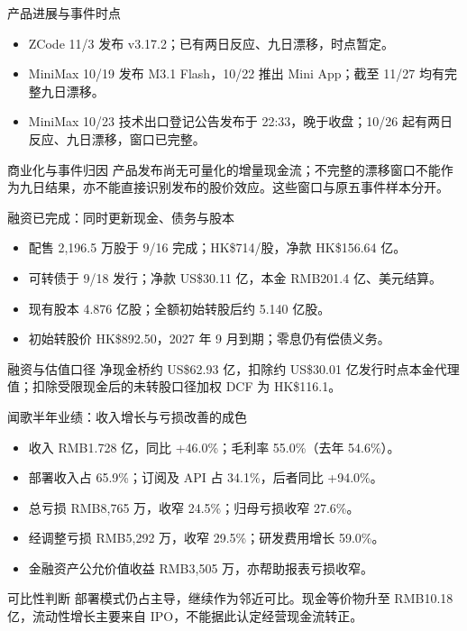 \documentclass[aspectratio=169,11pt]{beamer}
\newcommand{\smallnote}[1]{\vspace{0.2em}{\footnotesize #1}}
\begin{document}
\begin{frame}{产品进展与事件时点}
  \begin{itemize}
    \item ZCode 11/3 发布 v3.17.2；已有两日反应、九日漂移，时点暂定。
    \item MiniMax 10/19 发布 M3.1 Flash，10/22 推出 Mini App；截至 11/27 均有完整九日漂移。
    \item MiniMax 10/23 技术出口登记公告发布于 22:33，晚于收盘；10/26 起有两日反应、九日漂移，窗口已完整。
  \end{itemize}
  \begin{block}{商业化与事件归因}
    产品发布尚无可量化的增量现金流；不完整的漂移窗口不能作为九日结果，亦不能直接识别发布的股价效应。这些窗口与原五事件样本分开。
  \end{block}
  \smallnote{来源：ZCode 官方 changelog、MiniMax 产品公告及 10/23 港交所技术出口登记公告。}
\end{frame}

\begin{frame}{融资已完成：同时更新现金、债务与股本}
  \begin{itemize}
    \item 配售 2,196.5 万股于 9/16 完成；HK\$714/股，净款 HK\$156.64 亿。
    \item 可转债于 9/18 发行；净款 US\$30.11 亿，本金 RMB201.4 亿、美元结算。
    \item 现有股本 4.876 亿股；全额初始转股后约 5.140 亿股。
    \item 初始转股价 HK\$892.50，2027 年 9 月到期；零息仍有偿债义务。
  \end{itemize}
  \begin{block}{融资与估值口径}
    净现金桥约 US\$62.93 亿，扣除约 US\$30.01 亿发行时点本金代理值；扣除受限现金后的未转股口径加权 DCF 为 HK\$116.1。
  \end{block}
  \smallnote{来源：9/18 港交所完成公告。本金代理值 = 美元总款 / 100.5\%，非公允价值；不含未知现金消耗。}
\end{frame}

\begin{frame}{闻歌半年业绩：收入增长与亏损改善的成色}
  \begin{itemize}
    \item 收入 RMB1.728 亿，同比 +46.0\%；毛利率 55.0\%（去年 54.6\%）。
    \item 部署收入占 65.9\%；订阅及 API 占 34.1\%，后者同比 +94.0\%。
    \item 总亏损 RMB8,765 万，收窄 24.5\%；归母亏损收窄 27.6\%。
    \item 经调整亏损 RMB5,292 万，收窄 29.5\%；研发费用增长 59.0\%。
    \item 金融资产公允价值收益 RMB3,505 万，亦帮助报表亏损收窄。
  \end{itemize}
  \begin{block}{可比性判断}
    部署模式仍占主导，继续作为邻近可比。现金等价物升至 RMB10.18 亿，流动性增长主要来自 IPO，不能据此认定经营现金流转正。
  \end{block}
  \smallnote{来源：闻歌 8 月 25 日中期业绩公告；金额为人民币。原可比表已使用 H1 更新的 LTM 收入。}
\end{frame}
\end{document}
